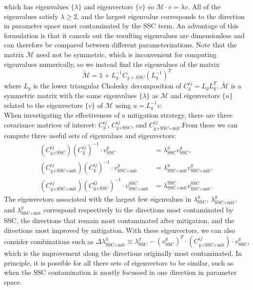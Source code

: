 \documentclass[a4paper,11pt]{article}
\begin{document}
which has eigenvalues $\{\lambda\}$ and eigenvectors $\{v\}$ so $\mathcal{M}\cdot v=\lambda v$. All of the eigenvalues satisfy $\lambda\ge2$, and the largest eigenvalue corresponds to the direction in parameter space most contaminated by the SSC term. An advantage of this formulation is that it cancels out the resulting eigenvalues are dimensionless and can therefore be compared between different parameterizations. Note that the matrix $\mathcal{M}$ need not be symmetric, which is inconvenient for computing eigenvalues numerically, so we instead find the eigenvalues of the matrix
\begin{equation}\label{m_tot_alt}
\widetilde{\mathcal{M}} = \mathbb{1}+L_g^{-1}C_{g+SSC}(L_g^{-1})^T
\end{equation} 
where $L_g$ is the lower triangular Cholesky decomposition of $C^{ij}_{\text{g}}=L_{g}L_g^T$. $\widetilde{\mathcal{M}}$ is a symmetric matrix with the same eigenvalues $\{\lambda\}$ as $\mathcal{M}$ and eigenvectors $\{u\}$ related to the eigenvectors $\{v\}$ of $\mathcal{M}$ using $u=L_g^{-1}v$.
\\
When investigating the effectiveness of a mitigation strategy, there are three covariance matrices of interest:  $C^{ij}_{\text{g}}$,  $C^{ij}_{\text{g+SSC}}$, and $C^{ij}_{\text{g+SSC+mit}}$.From these we can compute three useful sets of eigenvalues and eigenvectors: 
\begin{align}\label{matrices}
(C^{ij}_{\text{g+SSC}})(C^{ij}_{\text{g}})^{-1}\cdot v^g_{\text{SSC}}&=\lambda^g_{\text{SSC}} v^g_{\text{SSC}}, \\
(C^{ij}_{\text{g+SSC+mit}})(C^{ij}_{\text{g}})^{-1}\cdot v^g_{\text{SSC+mit}}&=\lambda^g_{\text{SSC+mit}} v^g_{\text{SSC+mit}},\\
(C^{ij}_{\text{g+SSC+mit}})(C^{ij}_{\text{g+SSC}})^{-1}\cdot v^\text{SSC}_{\text{SSC+mit}}&=\lambda^\text{SSC}_{\text{SSC+mit}} v^\text{SSC}_{\text{SSC+mit}}.
\end{align}
 The eigenvectors associated with the largest few eigenvalues in $\lambda^g_{\text{SSC}}$, $\lambda^g_{\text{SSC+mit}}$, and $\lambda^g_{\text{SSC+mit}}$  correspond respectively to the directions most contaminated by SSC, the directions that remain most contaminated after mitigation, and the directions most improved by mitigation. With these eigenvectors, we can also consider combinations such as $\Delta \lambda^g_{\text{SSC+mit}}\equiv\lambda^g_{\text{SSC}}-(v^g_{\text{SSC}})^T\cdot (C^{ij}_{\text{g+SSC+mit}})\cdot v^g_{\text{SSC}}$, which is the improvement along the directions originally most contaminated. In principle, it is possible for all there sets of eigenvectors to be similar, such as when the SSC contamination is mostly focussed in one direction in parameter space. 
\end{document}
